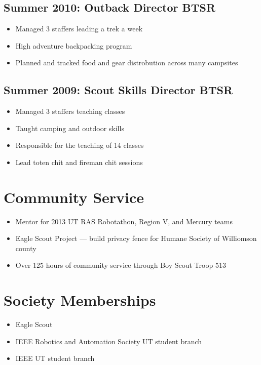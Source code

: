 \documentclass[letterpaper,12pt]{resume}
\begin{document}
\subsection{Summer 2010: Outback Director BTSR}
\begin{itemize}
  \item
    Managed 3 staffers leading a trek a week
  \item
    High adventure backpacking program
  \item
    Planned and tracked food and gear distrobution across many campsites
\end{itemize}

\subsection{Summer 2009: Scout Skills Director BTSR}
\begin{itemize}
  \item
    Managed 3 staffers teaching classes
  \item
    Taught camping and outdoor skills
  \item
    Responsible for the teaching of 14 classes
  \item
    Lead toten chit and fireman chit sessions
\end{itemize}

\section{Community Service}
\begin{itemize}
  \item
    Mentor for 2013 UT RAS Robotathon, Region V, and Mercury teams
  \item
    Eagle Scout Project --- build privacy fence for Humane Society of Williomson county
  \item
    Over 125 hours of community service through Boy Scout Troop 513
\end{itemize}

\section{Society Memberships}
\begin{itemize}
  \item
    Eagle Scout
  \item
    IEEE Robotics and Automation Society UT student branch
  \item
    IEEE UT student branch
\end{itemize}
\end{document}
